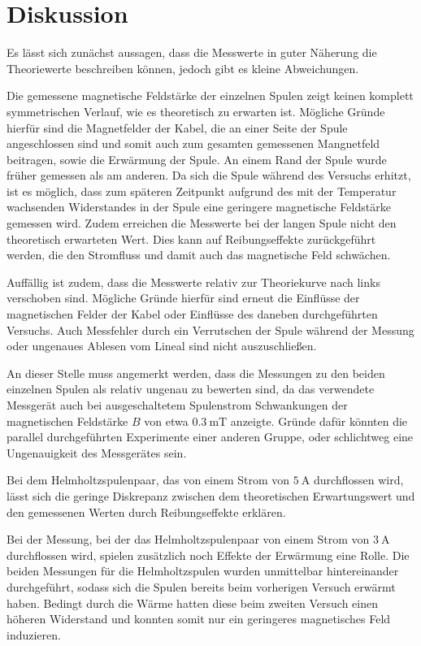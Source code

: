 \section{Diskussion}
\label{sec:Diskussion}
Es lässt sich zunächst aussagen, dass die Messwerte in guter Näherung die Theoriewerte
beschreiben können, jedoch gibt es kleine Abweichungen.

Die gemessene magnetische Feldstärke der einzelnen Spulen zeigt keinen komplett
symmetrischen Verlauf, wie es theoretisch zu erwarten ist. Mögliche Gründe hierfür sind
die Magnetfelder der Kabel, die an einer Seite der Spule angeschlossen sind und somit
auch zum gesamten gemessenen Mangnetfeld beitragen, sowie die Erwärmung der Spule.
An einem Rand der Spule wurde früher gemessen als am anderen. Da sich die Spule
während des Versuchs erhitzt, ist es möglich, dass zum späteren Zeitpunkt aufgrund des
mit der Temperatur wachsenden Widerstandes in der Spule eine geringere magnetische
Feldstärke gemessen wird. Zudem erreichen die Messwerte bei der langen Spule nicht
den theoretisch erwarteten Wert. Dies kann auf Reibungseffekte zurückgeführt werden,
die den Stromfluss und damit auch das magnetische Feld schwächen.

Auffällig ist zudem, dass die Messwerte relativ zur Theoriekurve nach links verschoben sind.
Mögliche Gründe hierfür sind erneut die Einflüsse der magnetischen Felder der Kabel oder
Einflüsse des daneben durchgeführten Versuchs. Auch Messfehler durch ein Verrutschen
der Spule während der Messung oder ungenaues Ablesen vom Lineal sind nicht auszuschließen.

An dieser Stelle muss angemerkt werden, dass die Messungen zu den beiden einzelnen Spulen
als relativ ungenau zu bewerten sind, da das verwendete Messgerät auch bei ausgeschaltetem
Spulenstrom Schwankungen der magnetischen Feldstärke $B$ von etwa $\SI{0,3}{\milli\tesla}$ anzeigte.
Gründe dafür könnten die parallel durchgeführten Experimente einer anderen Gruppe,
oder schlichtweg eine Ungenauigkeit des Messgerätes sein.

Bei dem Helmholtzspulenpaar, das von einem
Strom von $\SI{5}{\ampere}$ durchflossen wird, lässt sich die geringe Diskrepanz zwischen dem
theoretischen Erwartungswert und den gemessenen Werten durch Reibungseffekte erklären.

Bei der Messung, bei der das Helmholtzspulenpaar von einem Strom von $\SI{3}{\ampere}$ durchflossen
wird, spielen zusätzlich noch Effekte der Erwärmung eine Rolle. Die beiden Messungen
für die Helmholtzspulen wurden unmittelbar hintereinander durchgeführt, sodass sich die
Spulen bereits beim vorherigen Versuch erwärmt haben. Bedingt durch die Wärme
hatten diese beim zweiten Versuch einen höheren Widerstand und konnten somit nur ein
geringeres magnetisches Feld induzieren.

